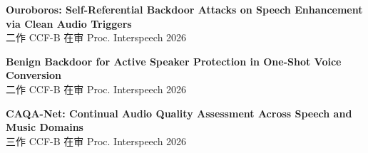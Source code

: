 \documentclass[a4paper,10pt]{article}
\begin{document}
\begin{enumerate}[leftmargin=*, after=\strut, label={[\arabic*]}]
    \item \textbf{Ouroboros: Self-Referential Backdoor Attacks on Speech Enhancement via Clean Audio Triggers}\\
    {\small 二作 \quad CCF-B \quad 在审 \quad Proc. Interspeech 2026}

    \item \textbf{Benign Backdoor for Active Speaker Protection in One-Shot Voice Conversion}\\
    {\small 二作 \quad CCF-B \quad 在审 \quad Proc. Interspeech 2026}

    \item \textbf{CAQA-Net: Continual Audio Quality Assessment Across Speech and Music Domains}\\
    {\small 三作 \quad CCF-B \quad 在审 \quad Proc. Interspeech 2026}
\end{enumerate}
\end{document}
